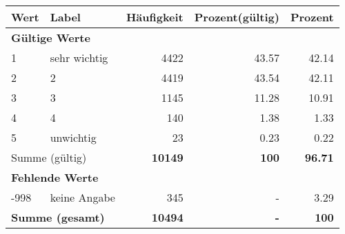      \begin{longtable}{lXrrr}
     \toprule
     \textbf{Wert} & \textbf{Label} & \textbf{Häufigkeit} & \textbf{Prozent(gültig)} & \textbf{Prozent} \\
     \endhead
     \midrule
     \multicolumn{5}{l}{\textbf{Gültige Werte}}\\

     1 &
     \multicolumn{1}{X}{ sehr wichtig   } &


       \num{4422} &
       \num[round-mode=places,round-precision=2]{43.57} &
         \num[round-mode=places,round-precision=2]{42.14} \\

     2 &
     \multicolumn{1}{X}{ 2   } &


       \num{4419} &
       \num[round-mode=places,round-precision=2]{43.54} &
         \num[round-mode=places,round-precision=2]{42.11} \\

     3 &
     \multicolumn{1}{X}{ 3   } &


       \num{1145} &
       \num[round-mode=places,round-precision=2]{11.28} &
         \num[round-mode=places,round-precision=2]{10.91} \\

     4 &
     \multicolumn{1}{X}{ 4   } &


       \num{140} &
       \num[round-mode=places,round-precision=2]{1.38} &
         \num[round-mode=places,round-precision=2]{1.33} \\

     5 &
     \multicolumn{1}{X}{ unwichtig   } &


       \num{23} &
       \num[round-mode=places,round-precision=2]{0.23} &
         \num[round-mode=places,round-precision=2]{0.22} \\
     \midrule
     \multicolumn{2}{l}{Summe (gültig)} &
       \textbf{\num{10149}} &
     \textbf{\num{100}} &
       \textbf{\num[round-mode=places,round-precision=2]{96.71}} \\
     \multicolumn{5}{l}{\textbf{Fehlende Werte}}\\
       -998 &
       keine Angabe &
         \num{345} &
        - &
         \num[round-mode=places,round-precision=2]{3.29} \\
     \midrule
     \multicolumn{2}{l}{\textbf{Summe (gesamt)}} &
          \textbf{\num{10494}} &
        \textbf{-} &
        \textbf{\num{100}} \\
     \bottomrule
     \end{longtable}
     
